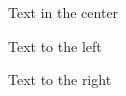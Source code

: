 \documentclass{article}  %
\begin{document}
 
 
\begin{center}
Text in the center
\end{center}
 
 
\begin{flushleft}
Text to the left
\end{flushleft}
 
 
\begin{flushright}
Text to the right
\end{flushright}
\end{document}
